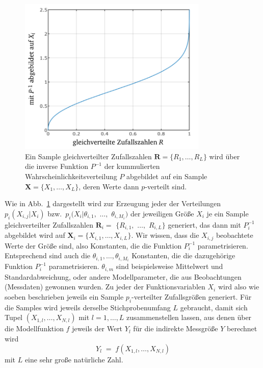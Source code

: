 \begin{figure}
\begin{center}
\includegraphics[width=90mm]{07_vorlesung/media/Zufallszahlen_abbilden_Verteilung.pdf}
\caption{\label{ZufallszahlenAbbilden} Ein Sample gleichverteilter Zufallszahlen
$\boldsymbol R = \{R_1, \dots, R_L\}$ wird über die inverse Funktion $P^{-1}$ der
kummulierten Wahrscheinlichkeitsverteilung $P$ abgebildet auf ein
Sample $\boldsymbol X = \{X_1, \dots, X_L\}$, deren Werte dann $p$-verteilt sind.}
\end{center}
\end{figure}
Wie in Abb.~\ref{ZufallszahlenAbbilden} dargestellt wird zur Erzeugung jeder der Verteilungen
$p_i (X_{i,j} | X_i)$ bzw.\ $p_i (X_i | \theta_{i,1},$ $\dots,$ $\theta_{i,M_i})$ der jeweiligen Größe
$X_i$ je ein Sample gleichverteilter Zufallszahlen $\boldsymbol R_i =$ $\{R_{i,1},$ $\dots,$ $R_{i,L}\}$ generiert, das
dann mit $P_i^{-1}$ abgebildet wird auf $\boldsymbol X_i = \{X_{i,1}, \dots, X_{i,L}\}$.
Wir wissen, dass die $X_{i,j}$ beobachtete Werte der Größe sind, also Konstanten, die die Funktion
$P_i^{-1}$ parametrisieren. Entsprechend sind auch die $\theta_{i,1}, \dots, \theta_{i,M_i}$ Konstanten, die
die dazugehörige Funktion $P_i^{-1}$ parametrisieren. $\theta_{i,m}$ sind beispielsweise Mittelwert und
Standardabweichung, oder andere Modellparameter, die aus Beobachtungen (Messdaten) gewonnen wurden.
Zu jeder der Funktionsvariablen $X_i$ wird also wie soeben beschrieben jeweils ein Sample $p_i$-verteilter
Zufallsgrößen generiert. Für die Samples wird jeweils derselbe Stichprobenumfang $L$ gebraucht, damit
sich Tupel $(X_{1,l}, \dots, X_{N,l})$ mit $l = 1,\dots, L$ zusammenstellen lassen, aus denen über die
Modellfunktion $f$ jeweils der Wert $Y_l$ für die indirekte Messgröße $Y$ berechnet wird
\begin{equation}
Y_l \; = \; f(X_{1,l}, \dots, X_{N,l})
\end{equation}
mit $L$ eine sehr große natürliche Zahl.

